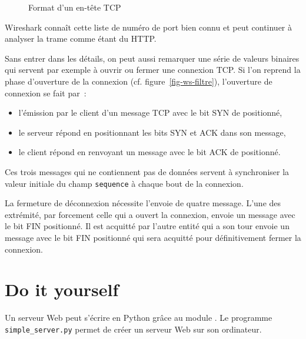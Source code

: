 \begin{figure}[tbp]
{
	} %

\caption{Format d'un en-tête TCP}
\label{fig-header-TCP}
\end{figure}


Wireshark connaît cette liste de numéro de port bien connu et peut continuer à analyser la trame comme étant du HTTP.

Sans entrer dans les détails, on peut aussi remarquer une série de valeurs binaires qui servent par exemple à ouvrir ou fermer une connexion TCP. Si l'on reprend la phase d'ouverture de la connexion (cf. figure~\vref{fig-ws-filtre}), l'ouverture de connexion se fait par~:
\begin{itemize}
    \item l'émission par le client d'un message TCP avec le bit SYN de positionné,
    \item le serveur répond en positionnant les bits SYN et ACK dans son message,
    \item le client répond en renvoyant un message avec le bit ACK de positionné.
\end{itemize}

Ces trois messages qui ne contiennent pas de données servent à synchroniser la valeur initiale du champ \texttt{sequence} à chaque bout de la connexion.
  
{La fermeture de déconnexion nécessite l'envoie de quatre message. L'une des extrémité, par forcement celle qui a ouvert la connexion, envoie un message avec le bit FIN positionné. Il est acquitté par l'autre entité qui a son tour envoie un message avec le bit FIN positionné qui sera acquitté pour définitivement fermer la connexion.
}   

\section{Do it yourself}\label{chap-flask}

Un serveur Web peut s'écrire en Python grâce au module . Le programme \texttt{simple\_server.py} permet de créer un serveur Web sur son ordinateur.

